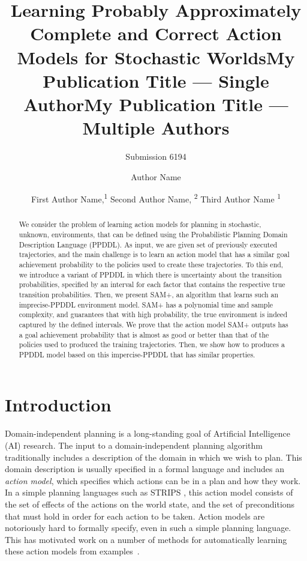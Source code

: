 \documentclass[letterpaper]{article} %
\title{Learning Probably  Approximately Complete and Correct Action Models for Stochastic Worlds}
\author{Submission 6194}
\title{My Publication Title --- Single Author}
\author {
    Author Name
}
\title{My Publication Title --- Multiple Authors}
\author {
    First Author Name,\textsuperscript{\rm 1}
    Second Author Name, \textsuperscript{\rm 2}
    Third Author Name \textsuperscript{\rm 1}
}
\begin{document}
\maketitle

\begin{abstract}
We consider the problem of learning action models for planning 
in stochastic, unknown, environments, that can be defined using the Probabilistic Planning Domain Description Language (PPDDL). 
As input, we are given set of previously executed trajectories, and the main challenge is to learn an action model that has a similar goal achievement probability to the policies used to create these trajectories. 
To this end, we introduce a variant of PPDDL in which there is uncertainty about the transition probabilities, specified by an interval for each factor that contains the respective true transition probabilities. 
Then, we present SAM+, an algorithm that learns such an imprecise-PPDDL environment model. 
SAM+ has a polynomial time and sample complexity, and guarantees that with high probability, the true environment is indeed captured by the defined intervals. 
We prove that the action model SAM+ outputs has a goal achievement probability that is almost as good or better than that of the policies used to produced the training trajectories.   
Then, we show how to produces a PPDDL model based on this impercise-PPDDL that has similar properties. 
\end{abstract}

\section{Introduction}

Domain-independent planning is a long-standing goal of Artificial Intelligence (AI) research. 
The input to a domain-independent planning algorithm traditionally includes a description of the domain in which we wish to plan.
This domain description is usually specified in a formal language and includes an \emph{action model}, which specifies which actions can be in a plan and how they work. 
In a simple planning languages such as STRIPS \cite{fikes1971strips}, this action model consists of the set of effects of the actions on the world state, and the set of preconditions that must hold in order for each action to be taken. 
Action models are notoriously hard to formally specify, even in such a simple planning language. 
This has motivated work on a number of methods for automatically learning these action models from examples~\cite{yang2007learning,cresswell2011generalised,cresswell2013acquiring,zhuo2013action,stern2017efficientAndSafe,aineto19,juba2021kr}. 
\end{document}
